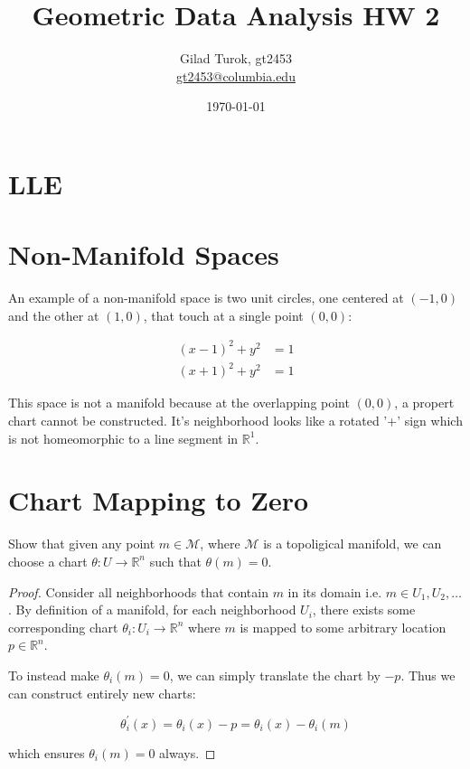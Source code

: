 \documentclass{article}
\title{Geometric Data Analysis HW 2}
\author{Gilad Turok, gt2453 \\ \href{mailto:gt2453@columbia.edu}{gt2453@columbia.edu}}
\date{\today}
\begin{document}
\maketitle

\section[]{LLE}

\section{Non-Manifold Spaces}

    An example of a non-manifold space is two unit circles, one centered at $(-1,0)$ and the other at $(1,0)$, that touch at a single point $(0,0)$:

    \begin{align*}
        (x-1)^2 + y^2 &= 1 \\
        (x+1)^2 + y^2 &= 1
    \end{align*}

    This space is not a manifold because at the overlapping point $(0,0)$, a propert chart cannot be constructed. It's neighborhood looks like a rotated '+' sign which is not homeomorphic to a line segment in $\mathbb{R}^1$.

\section{Chart Mapping to Zero}

    Show that given any point $m \in \mathcal{M}$, where $\mathcal{M}$ is a topoligical manifold, we can choose a chart $\theta : U \rightarrow \mathbb{R}^n$ such that $\theta(m) = 0$.

    \begin{proof}
        Consider all neighborhoods that contain $m$ in its domain i.e. $m \in U_1, U_2, \ldots$. By definition of a manifold, for each neighborhood $U_i$, there exists some corresponding chart $\theta_i : U_i \rightarrow \mathbb{R}^n$ where $m$ is mapped to some arbitrary location $p \in \mathbb{R}^n$.

        To instead make $\theta_i(m) = 0$, we can simply translate the chart by $-p$. Thus we can construct entirely new charts:
        
        \begin{equation*}
            \theta^\prime_i(x) = \theta_i(x) - p = \theta_i(x) - \theta_i(m)
        \end{equation*}

        which ensures $\theta_i(m) = 0 $ always.

    \end{proof}
\end{document}
